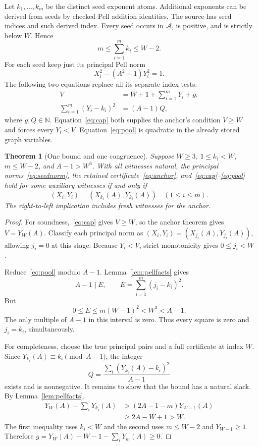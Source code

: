 \documentclass[11pt]{article}
\newtheorem{theorem}{Theorem}[section]
\theoremstyle{definition}\newtheorem{definition}[theorem]{Definition}
\theoremstyle{remark}\newtheorem{remark}[theorem]{Remark}
\newcommand{\N}{\mathbb N}\newcommand{\Z}{\mathbb Z}
\begin{document}
Let $k_1,\ldots,k_m$ be the distinct seed exponent atoms. Additional exponents can be derived from seeds by checked Pell addition identities. The source has \SeedCount{} seed indices and \DerivedCount{} such derived index. Every seed occurs in $\mathcal A$, is positive, and is strictly below $W$. Hence
\begin{equation}\label{eq:seedcount}
 m\le\sum_{i=1}^m k_i\le W-2.
\end{equation}
For each seed keep just its principal Pell norm
\begin{equation}\label{eq:seednorm}
 X_i^2-(A^2-1)Y_i^2=1.
\end{equation}
The following two equations replace all its separate index tests:
\begin{align}
 V&=W+1+\sum_{i=1}^m Y_i+g,\label{eq:cap}\\
 \sum_{i=1}^m(Y_i-k_i)^2&=(A-1)Q,\label{eq:pool}
\end{align}
where $g,Q\in\N$. Equation~\eqref{eq:cap} both supplies the anchor's condition $V\ge W$ and forces every $Y_i<V$. Equation~\eqref{eq:pool} is quadratic in the already stored graph variables.

\begin{theorem}[One bound and one congruence]\label{thm:pool}
Suppose $W\ge3$, $1\le k_i<W$, $m\le W-2$, and $A-1>W^3$. With all witnesses natural, the principal norms~\eqref{eq:seednorm}, the retained certificate~\eqref{eq:anchor}, and~\eqref{eq:cap}--\eqref{eq:pool} hold for some auxiliary witnesses if and only if
\[
 (X_i,Y_i)=(X_{k_i}(A),Y_{k_i}(A))\quad(1\le i\le m).
\]
The right-to-left implication includes fresh witnesses for the anchor.
\end{theorem}
\begin{proof}
For soundness,~\eqref{eq:cap} gives $V\ge W$, so the anchor theorem gives $V=Y_W(A)$. Classify each principal norm as
$(X_i,Y_i)=(X_{j_i}(A),Y_{j_i}(A))$, allowing $j_i=0$ at this stage. Because $Y_i<V$, strict monotonicity gives $0\le j_i<W$.

Reduce~\eqref{eq:pool} modulo $A-1$. Lemma~\ref{lem:pellfacts} gives
\[
 A-1\mid E,\qquad E=\sum_{i=1}^m(j_i-k_i)^2.
\]
But
\[
 0\le E\le m(W-1)^2<W^3<A-1.
\]
The only multiple of $A-1$ in this interval is zero. Thus every square is zero and $j_i=k_i$, simultaneously.

For completeness, choose the true principal pairs and a full certificate at index $W$. Since $Y_{k_i}(A)\equiv k_i\pmod{A-1}$, the integer
\[
 Q=\frac{\sum_i(Y_{k_i}(A)-k_i)^2}{A-1}
\]
exists and is nonnegative. It remains to show that the bound has a natural slack. By Lemma~\ref{lem:pellfacts},
\begin{align*}
 Y_W(A)-\sum_iY_{k_i}(A)
 &> (2A-1-m)Y_{W-1}(A)\\
 &\ge 2A-W+1>W.
\end{align*}
The first inequality uses $k_i<W$ and the second uses $m\le W-2$ and $Y_{W-1}\ge1$. Therefore
$g=Y_W(A)-W-1-\sum_iY_{k_i}(A)\ge0$.
\end{proof}
\end{document}

